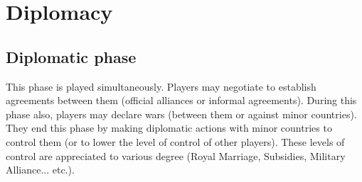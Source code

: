 
\chapter{Diplomacy}
\label{chapter:Diplo}




\section{Diplomatic phase}

\aparag[Overview.]
This phase is played simultaneously. Players may negotiate to establish
agreements between them (official alliances or informal agreements).  During
this phase also, players may declare wars (between them or against minor
countries).  They end this phase by making diplomatic actions with minor
countries to control them (or to lower the level of control of other
players). These levels of control are appreciated to various degree (Royal
Marriage, Subsidies, Military Alliance... etc.).
\aparag[Sequence.]
\DiploDetails












%




